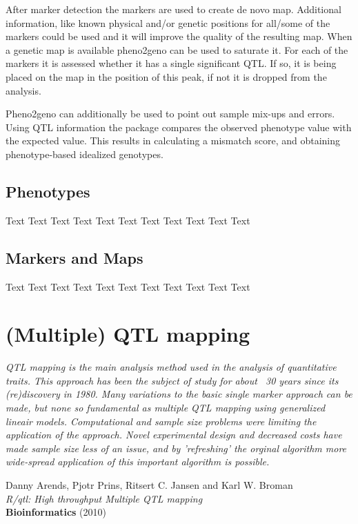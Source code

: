 \documentclass[8pt, twoside, a5paper]{report}
\newenvironment{myexampleblock}[1]{%
    \tcolorbox[beamer,%
    noparskip,breakable,
    colback=LightGreen,colframe=DarkGreen,%
    colbacklower=LimeGreen!75!LightGreen,%
    title=#1]}%
    {\endtcolorbox}
\newcommand{\authors}[1]{\small{#1}}
\newcommand{\bold}[1]{{\bfseries #1}}
\begin{document}
After marker detection the markers are used to create de novo map. Additional information, like known physical 
and/or genetic positions for all/some of the markers could be used and it will improve the quality of the 
resulting map. When a genetic map is available pheno2geno can be used to saturate it. For each of the markers 
it is assessed whether it has a single significant QTL. If so, it is being placed on the map in the position 
of this peak, if not it is dropped from the analysis.

Pheno2geno can additionally be used to point out sample mix-ups and errors. Using QTL information the package 
compares the observed phenotype value with the expected value. This results in calculating a mismatch score, 
and obtaining phenotype-based idealized genotypes. 

\section{Phenotypes}
Text Text Text Text Text Text Text Text Text Text Text

\section{Markers and Maps}
Text Text Text Text Text Text Text Text Text Text Text

\chapter{(Multiple) QTL mapping}

\emph{QTL mapping is the main analysis method used in the analysis of quantitative traits. This approach has been 
the subject of study for about ~30 years since its (re)discovery in 1980. Many variations to the basic single 
marker approach can be made, but none so fundamental as multiple QTL mapping using generalized lineair models. 
Computational and sample size problems were limiting the application of the approach. Novel experimental 
design and decreased costs have made sample size less of an issue, and by 'refreshing' the orginal algorithm 
more wide-spread application of this important algorithm is possible.}
\null
\vfill

\begin{myexampleblock}{Originally published as:}
  \authors{Danny Arends, Pjotr Prins, Ritsert C. Jansen and Karl W. Broman}\\
  \emph{R/qtl: High throughput Multiple QTL mapping}\\
  \bold{Bioinformatics} (2010)
\end{myexampleblock}
\end{document}
